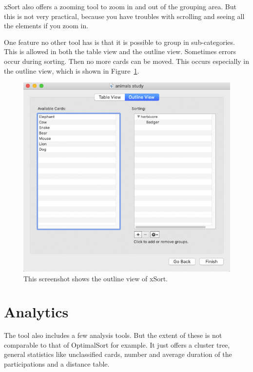 xSort also offers a zooming tool to zoom in and out
of the grouping area. But this is not very practical, because 
you have troubles with scrolling and seeing all the elements 
if you zoom in. 

One feature no other tool has is that it is possible to group in 
sub-categories. This is allowed in both the table view and the 
outline view. Sometimes errors occur during sorting. Then 
no more cards can be moved. This occurs especially in the 
outline view, which is shown in Figure~\ref{fig:xSort-outlineview}.



\begin{figure}[tp] 
\centering
\includegraphics[keepaspectratio,width=460px]{images/xsort-outlineview.png}
\caption[xSort Outline View] { This screenshot shows the outline view of xSort.
 }
\label{fig:xSort-outlineview}
\end{figure}



\section{Analytics}

The tool also includes a few analysis tools. But the extent of 
these is not comparable to that of OptimalSort for example. 
It just offers a cluster tree, general statistics like unclassified 
cards, number and average duration of the participations 
and a distance table.  

